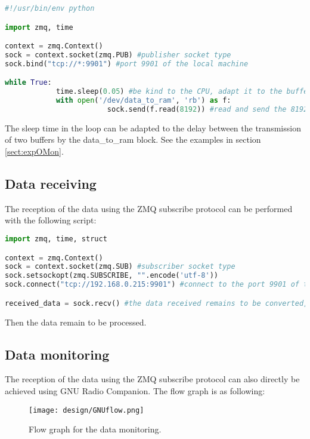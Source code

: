 \documentclass[12pt,oneside]{article}
\begin{document}
\vspace{-0.1cm}
\begin{lstlisting}[language=Python]
#!/usr/bin/env python

import zmq, time

context = zmq.Context()
sock = context.socket(zmq.PUB) #publisher socket type
sock.bind("tcp://*:9901") #port 9901 of the local machine

while True:
			time.sleep(0.05) #be kind to the CPU, adapt it to the buffer delay
			with open('/dev/data_to_ram', 'rb') as f:
						sock.send(f.read(8192)) #read and send the 8192 data of the data_to_ram buffer
\end{lstlisting}
\vspace{0.5cm}

The sleep time in the loop can be adapted to the delay between the transmission of two buffers by the data\_to\_ram block. See the examples in section \ref*{sect:expOMon}. 

\subsection{Data receiving}

The reception of the data using the ZMQ subscribe protocol can be performed with the following script:

\begin{lstlisting}[language=Python]
import zmq, time, struct

context = zmq.Context()
sock = context.socket(zmq.SUB) #subscriber socket type
sock.setsockopt(zmq.SUBSCRIBE, "".encode('utf-8'))
sock.connect("tcp://192.168.0.215:9901") #connect to the port 9901 of the 192.168.0.215 machine

received_data = sock.recv() #the data received remains to be converted, deinterleaved...
\end{lstlisting}
\vspace{0.5cm}

Then the data remain to be processed.

\subsection{Data monitoring}

The reception of the data using the ZMQ subscribe protocol can also directly be achieved using GNU Radio Companion. The flow graph is as following: 
\vspace{0.5cm}
\begin{figure}[h!tb]
	\begin{center}
		\texttt{[image: design/GNUflow.png]}
		\caption{Flow graph for the data monitoring.}
		\label{fig:gnuradioflowgraph}
	\end{center}
\end{figure}
\vspace{0cm}
\end{document}
